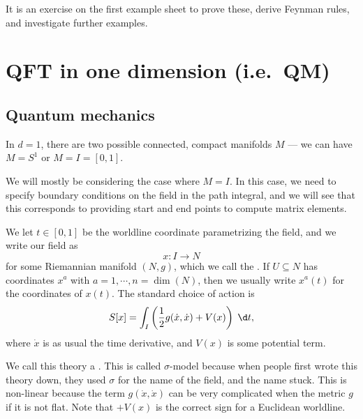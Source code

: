\documentclass[a4paper]{article}
\begin{document}
It is an exercise on the first example sheet to prove these, derive Feynman rules, and investigate further examples.
\section{QFT in one dimension (i.e.\ QM)}
\subsection{Quantum mechanics}
In $d = 1$, there are two possible connected, compact manifolds $M$ --- we can have $M = S^1$ or $M = I = [0, 1]$.
\begin{center}
\end{center}
We will mostly be considering the case where $M = I$. In this case, we need to specify boundary conditions on the field in the path integral, and we will see that this corresponds to providing start and end points to compute matrix elements.

We let $t \in [0, 1]$ be the worldline coordinate parametrizing the field, and we write our field as
\[
  x: I \to N
\]
for some Riemannian manifold $(N, g)$, which we call the . If $U\subseteq N$ has coordinates $x^a$ with $a = 1, \cdots, n = \dim (N)$, then we usually write $x^a(t)$ for the coordinates of $x(t)$. The standard choice of action is
\[
  S[x] = \int_I \left(\frac{1}{2} g(\dot{x}, \dot{x}) + V(x)\right)\;\d t,
\]
where $\dot{x}$ is as usual the time derivative, and $V(x)$ is some potential term.

We call this theory a . This is called $\sigma$-model because when people first wrote this theory down, they used $\sigma$ for the name of the field, and the name stuck. This is non-linear because the term $g(\dot{x}, \dot{x})$ can be very complicated when the metric $g$ if it is not flat. Note that $+V(x)$ is the correct sign for a Euclidean worldline.
\end{document}

